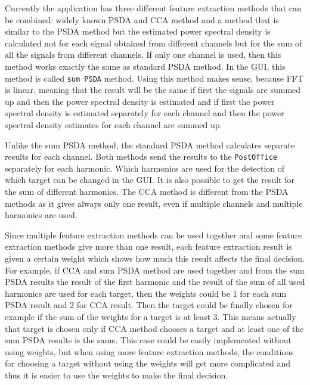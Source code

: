 Currently the application has three different \gls{feature extraction} methods that can be combined: widely known \gls{PSDA} and \gls{CCA} method and a method that is similar to the \gls{PSDA} method but the estimated \gls{power spectral density} is calculated not for each signal obtained from different channels but for the sum of all the signals from different channels. If only one channel is used, then this method works exactly the same as standard \gls{PSDA} method. In the \gls{GUI}, this method is called \texttt{sum \gls{PSDA}} method. Using this method makes sense, because \gls{FFT} is linear, meaning that the result will be the same if first the signals are summed up and then the \gls{power spectral density} is estimated and if first the \gls{power spectral density} is estimated separately for each channel and then the \gls{power spectral density} estimates for each channel are summed up.

Unlike the sum \gls{PSDA} method, the standard \gls{PSDA} method calculates separate results for each channel. Both methods send the results to the \texttt{PostOffice} separately for each \gls{harmonic}. Which \glspl{harmonic} are used for the detection of which \gls{target} can be changed in the \gls{GUI}. It is also possible to get the result for the sum of different \glspl{harmonic}. The \gls{CCA} method is different from the \gls{PSDA} methods as it gives always only one result, even if multiple channels and multiple harmonics are used.

Since multiple \gls{feature extraction} methods can be used together and some \gls{feature extraction} methods give more than one result, each \gls{feature extraction} result is given a certain weight which shows how much this result affects the final decision. For example, if \gls{CCA} and sum \gls{PSDA} method are used together and from the sum \gls{PSDA} results the result of the first \gls{harmonic} and the result of the sum of all used \glspl{harmonic} are used for each \gls{target}, then the weights could be 1 for each sum \gls{PSDA} result and 2 for \gls{CCA} result. Then the \gls{target} could be finally chosen for example if the sum of the weights for a \gls{target} is at least 3. This means actually that \gls{target} is chosen only if \gls{CCA} method chooses a \gls{target} and at least one of the sum \gls{PSDA} results is the same. This case could be easily implemented without using weights, but when using more \gls{feature extraction} methods, the conditions for choosing a target without using the weights will get more complicated and thus it is easier to use the weights to make the final decision.

